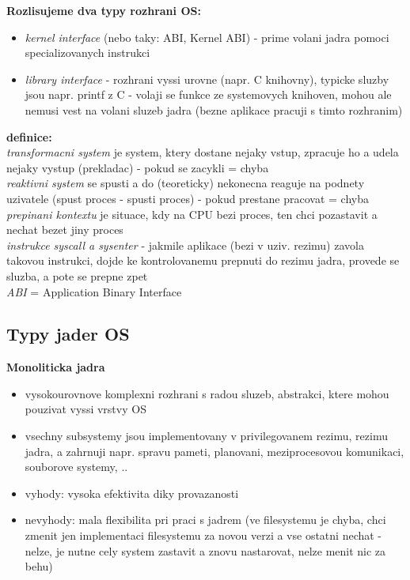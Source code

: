 \documentclass[a4paper, 11pt]{article}
\begin{document}
\noindent\textbf{Rozlisujeme dva typy rozhrani OS:} \label{kernel-interfaces}
\begin{itemize}
    \item \textit{kernel interface} (nebo taky: ABI, Kernel ABI) - prime volani jadra pomoci specializovanych instrukci
    \item \textit{library interface} - rozhrani vyssi urovne (napr. C knihovny), typicke sluzby jsou napr. printf z C - volaji se funkce ze         systemovych knihoven, mohou ale nemusi vest na volani sluzeb jadra (bezne aplikace pracuji s timto rozhranim) \\
\end{itemize}

\noindent\textbf{definice:} \\[0.5em] \label{prepinani-kontextu-jadro}
\textit{transformacni system} je system, ktery dostane nejaky vstup, zpracuje ho a udela nejaky vystup (prekladac) - pokud se zacykli = chyba \\[0.2em]
\textit{reaktivni system} se spusti a do (teoreticky) nekonecna reaguje na podnety uzivatele (spust proces - spusti proces) - pokud prestane pracovat = chyba \\[0.2em]
\textit{prepinani kontextu} je situace, kdy na CPU bezi proces, ten chci pozastavit a nechat bezet jiny proces \\[0.2em]
\textit{instrukce syscall a sysenter} - jakmile aplikace (bezi v uziv. rezimu) zavola takovou instrukci, dojde ke kontrolovanemu prepnuti do rezimu jadra, provede se sluzba, a pote se prepne zpet \\[0.2em]
\textit{ABI} = Application Binary Interface

\newpage

\subsection{Typy jader OS}

\noindent\textbf{Monoliticka jadra}
\begin{itemize}
    \item vysokourovnove komplexni rozhrani s radou sluzeb, abstrakci, ktere mohou pouzivat vyssi vrstvy OS
    \item vsechny subsystemy jsou implementovany v privilegovanem rezimu, rezimu jadra, a zahrnuji napr. spravu pameti, planovani, meziprocesovou komunikaci, souborove systemy, ..
    \item vyhody: vysoka efektivita diky provazanosti
    \item nevyhody: mala flexibilita pri praci s jadrem (ve filesystemu je chyba, chci zmenit jen implementaci filesystemu za novou verzi a vse ostatni nechat - nelze, je nutne cely system zastavit a znovu nastarovat, nelze menit nic za behu) \\
\end{itemize}
\end{document}
